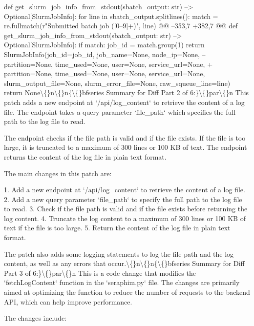 \documentclass{article}
\begin{document}
{ def get\_slurm\_job\_info\_from\_stdout(sbatch\_output: str) --\textgreater{} Optional[SlurmJobInfo]:
     for line in sbatch\_output.splitlines():
         match = re.fullmatch(r"Submitted batch job ([0--9]+)", line)
@@ --353,7 +382,7 @@ def get\_slurm\_job\_info\_from\_stdout(sbatch\_output: str) --\textgreater{} Optional[SlurmJobInfo]:
         if match:
             job\_id = match.group(1)
             return SlurmJobInfo(job\_id=job\_id, job\_name=None, node\_ip=None, 
--                                partition=None, time\_used=None, user=None, service\_url=None,
+                                partition=None, time\_used=None, user=None, service\_url=None,
                                 slurm\_output\_file=None, slurm\_error\_file=None, raw\_squeue\_line=line)
     return None\textbackslash\{\}n\textbackslash\{\}n\{\textbackslash\{\}bfseries Summary for Diff Part 2 of 6:\}\textbackslash\{\}par\textbackslash\{\}n  This patch adds a new endpoint at `/api/log\_content` to retrieve the content of a log file. The endpoint takes a query parameter `file\_path` which specifies the full path to the log file to read.

The endpoint checks if the file path is valid and if the file exists. If the file is too large, it is truncated to a maximum of 300 lines or 100 KB of text. The endpoint returns the content of the log file in plain text format.

The main changes in this patch are:

1. Add a new endpoint at `/api/log\_content` to retrieve the content of a log file.
2. Add a new query parameter `file\_path` to specify the full path to the log file to read.
3. Check if the file path is valid and if the file exists before returning the log content.
4. Truncate the log content to a maximum of 300 lines or 100 KB of text if the file is too large.
5. Return the content of the log file in plain text format.

The patch also adds some logging statements to log the file path and the log content, as well as any errors that occur.\textbackslash\{\}n\textbackslash\{\}n\{\textbackslash\{\}bfseries Summary for Diff Part 3 of 6:\}\textbackslash\{\}par\textbackslash\{\}n  This is a code change that modifies the `fetchLogContent` function in the `seraphim.py` file. The changes are primarily aimed at optimizing the function to reduce the number of requests to the backend API, which can help improve performance.

The changes include:

}
\end{document}
